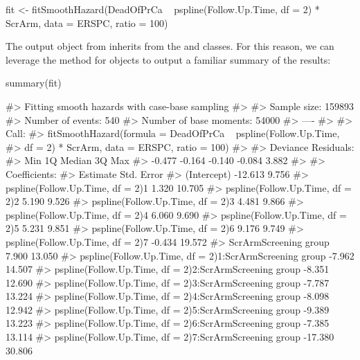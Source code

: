 \begin{Schunk}
\begin{Sinput}
fit <- fitSmoothHazard(DeadOfPrCa ~ pspline(Follow.Up.Time, df = 2) * ScrArm, 
                       data = ERSPC, ratio = 100)
\end{Sinput}
\end{Schunk}

The output object from  inherits from the
 and  classes. For this reason, we can
leverage the  method for  objects to output a
familiar summary of the results:

\begin{Schunk}
\begin{Sinput}
summary(fit) 
\end{Sinput}
\begin{Soutput}
#> Fitting smooth hazards with case-base sampling
#> 
#> Sample size: 159893 
#> Number of events: 540 
#> Number of base moments: 54000 
#> ----
#> 
#> Call:
#> fitSmoothHazard(formula = DeadOfPrCa ~ pspline(Follow.Up.Time, 
#>     df = 2) * ScrArm, data = ERSPC, ratio = 100)
#> 
#> Deviance Residuals: 
#>    Min      1Q  Median      3Q     Max  
#> -0.477  -0.164  -0.140  -0.084   3.882  
#> 
#> Coefficients:
#>                                                        Estimate Std. Error
#> (Intercept)                                             -12.613      9.756
#> pspline(Follow.Up.Time, df = 2)1                          1.320     10.705
#> pspline(Follow.Up.Time, df = 2)2                          5.190      9.526
#> pspline(Follow.Up.Time, df = 2)3                          4.481      9.866
#> pspline(Follow.Up.Time, df = 2)4                          6.060      9.690
#> pspline(Follow.Up.Time, df = 2)5                          5.231      9.851
#> pspline(Follow.Up.Time, df = 2)6                          9.176      9.749
#> pspline(Follow.Up.Time, df = 2)7                         -0.434     19.572
#> ScrArmScreening group                                     7.900     13.050
#> pspline(Follow.Up.Time, df = 2)1:ScrArmScreening group   -7.962     14.507
#> pspline(Follow.Up.Time, df = 2)2:ScrArmScreening group   -8.351     12.690
#> pspline(Follow.Up.Time, df = 2)3:ScrArmScreening group   -7.787     13.224
#> pspline(Follow.Up.Time, df = 2)4:ScrArmScreening group   -8.098     12.942
#> pspline(Follow.Up.Time, df = 2)5:ScrArmScreening group   -9.389     13.223
#> pspline(Follow.Up.Time, df = 2)6:ScrArmScreening group   -7.385     13.114
#> pspline(Follow.Up.Time, df = 2)7:ScrArmScreening group  -17.380     30.806

\end{Soutput}
\end{Schunk}
